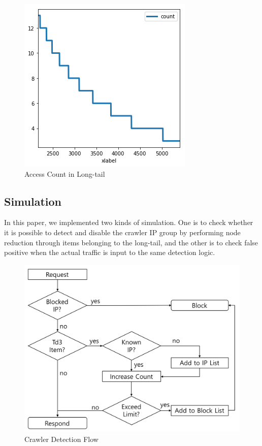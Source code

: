 \documentclass[sigconf,anonymous=false]{acmart}
\begin{document}
\begin{figure}[H]
    \centering
    \includegraphics[width=0.80\columnwidth]{figs/figure_04_td3.png}
    \caption{Access Count in Long-tail}
    \label{fig:my_label}
\end{figure}

\subsection{Simulation}
In this paper, we implemented two kinds of simulation. One is to check whether it is possible to detect and disable the crawler IP group by performing node reduction through items belonging to the long-tail, and the other is to check false positive when the actual traffic is input to the same detection logic.

\begin{figure}
    \includegraphics[width=0.8\columnwidth]{figs/flow_chart_01.png}
    \caption{Crawler Detection Flow}
    \label{fig:my_label}
\end{figure}
\end{document}
